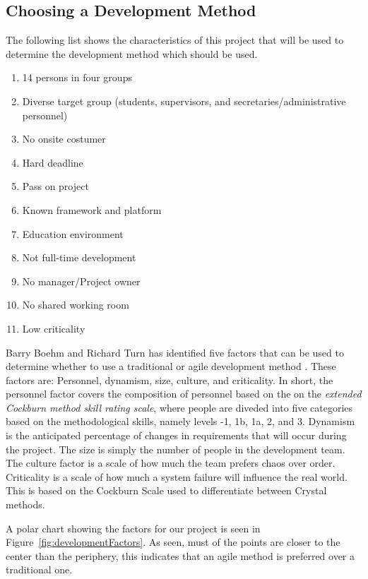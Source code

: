 \subsection{Choosing a Development Method}
The following list shows the characteristics of this project that will be used to determine the development method which should be used.
\begin{enumerate}
	\item 14 persons in four groups \label{enum:groupSize}
	\item Diverse target group (students, supervisors, and secretaries/administrative personnel) \label{enum:targetGroup}
	\item No onsite costumer \label{enum:onsite}
	\item Hard deadline \label{enum:deadline}
	\item Pass on project \label{enum:passed}
	\item Known framework and platform \label{enum:framework}
	\item Education environment \label{enum:education}
	\item Not full-time development \label{enum:halftime}
	\item No manager/Project owner \label{enum:manager}
	\item No shared working room \label{enum:room}
	\item Low criticality \label{enum:criticality}
\end{enumerate}
Barry Boehm and Richard Turn has identified five factors that can be used to determine whether to use a traditional or agile development method \cite{boehmTurner}.
These factors are: Personnel, dynamism, size, culture, and criticality.
In short, the personnel factor covers the composition of personnel based on the on the \textit{extended Cockburn method skill rating scale}, where people are diveded into five categories based on the methodological skills, namely levels -1, 1b, 1a, 2, and 3.
Dynamism is the anticipated percentage of changes in requirements that will occur during the project.
The size is simply the number of people in the development team.
The culture factor is a scale of how much the team prefers chaos over order.
Criticality is a scale of how much a system failure will influence the real world.
This is based on the Cockburn Scale used to differentiate between Crystal methods.


A polar chart showing the factors for our project is seen in Figure~\ref{fig:developmentFactors}.
As seen, must of the points are closer to the center than the periphery, this indicates that an agile method is preferred over a traditional one.

